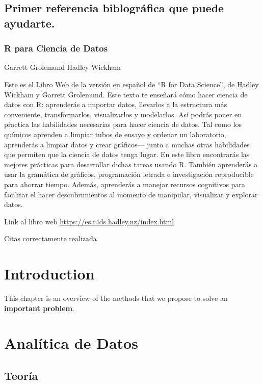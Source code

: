 \documentclass[]{article}
\begin{document}
\subsection{Primer referencia biblográfica que puede
ayudarte.}\label{primer-referencia-biblogruxe1fica-que-puede-ayudarte.}

\subsubsection{R para Ciencia de Datos}\label{r-para-ciencia-de-datos}

Garrett Grolemund Hadley Wickham

Este es el Libro Web de la versión en español de ``R for Data Science'',
de Hadley Wickham y Garrett Grolemund. Este texto te enseñará cómo hacer
ciencia de datos con R: aprenderás a importar datos, llevarlos a la
estructura más conveniente, transformarlos, visualizarlos y modelarlos.
Así podrás poner en pŕactica las habilidades necesarias para hacer
ciencia de datos. Tal como los químicos aprenden a limpiar tubos de
ensayo y ordenar un laboratorio, aprenderás a limpiar datos y crear
gráficos--- junto a muchas otras habilidades que permiten que la ciencia
de datos tenga lugar. En este libro encontrarás las mejores prácticas
para desarrollar dichas tareas usando R. También aprenderás a usar la
gramática de gráficos, programación letrada e investigación reproducible
para ahorrar tiempo. Además, aprenderás a manejar recursos cognitivos
para facilitar el hacer descubrimientos al momento de manipular,
visualizar y explorar datos.

Link al libro web \url{https://es.r4ds.hadley.nz/index.html}

Citas correctamente realizada \autocite{wickham2018r}

\section{Introduction}\label{introduction}

This chapter is an overview of the methods that we propose to solve an
\textbf{important problem}.

\section{Analítica de Datos}\label{Encuentro_1}

\subsection{Teoría}\label{teoruxeda}
\end{document}
